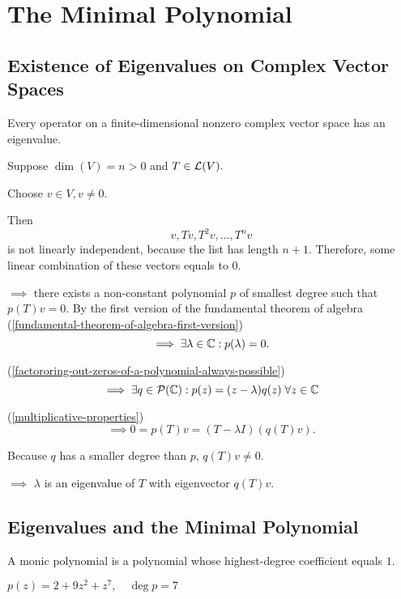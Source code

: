 \section{The Minimal Polynomial}
\subsection{Existence of Eigenvalues on Complex Vector Spaces}

\begin{thm}
  Every operator on a finite-dimensional nonzero complex vector space has an eigenvalue.
\end{thm}
\begin{prf}
  Suppose $\dim(V)=n>0$ and $T\in \mathcal{L}(V).$ 
  
  Choose $v\in V, v\neq0$. 
  
  Then 
  \begin{equation}
    v, Tv, T^2v, \dots, T^nv
  \end{equation} 
  is not linearly independent, 
  because the list has length $n+1$. Therefore, some linear combination of these vectors equals to $0$. 
  
  $\implies$ there exists a non-constant polynomial $p$ of smallest degree such that $p(T)v = 0$. By the first version of the fundamental theorem of algebra (\ref{fundamental-theorem-of-algebra-first-version}) 
  \begin{equation}
    \implies \exists \lambda \in \mathbb{C}: p(\lambda) = 0.
  \end{equation}
  
  (\ref{factororing-out-zeros-of-a-polynomial-always-possible})
  \begin{equation}
    \implies \exists q \in \mathcal {P} (\mathbb{C}): p(z) = (z-\lambda)  q(z) \; \forall z \in \mathbb{C} 
  \end{equation}
  
  (\ref{multiplicative-properties})
  \begin{equation}
    \implies 0=p(T)v=(T-\lambda I) (q(T)v). 
  \end{equation}
  
  Because $q$ has a smaller degree than $p$, $q(T)v \neq 0$. 
  
  $\implies$ $\lambda$ is an eigenvalue of $T$ with eigenvector $q(T)v$.
  
\end{prf}

\subsection{Eigenvalues and the Minimal Polynomial}
\begin{mydef}
  A monic polynomial is a polynomial whose highest-degree coefficient equals $1$.
\end{mydef}
\begin{example}
  $p(z)=2+9z^2+z^7, \quad \deg p = 7$
\end{example}

